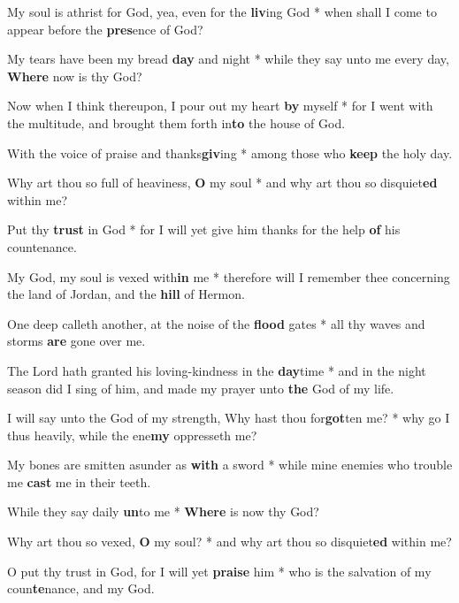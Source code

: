\begin{multicols}{2}
	My soul is athrist for God, yea, even for the \textbf{liv}ing God * when shall I come to appear before the \textbf{pres}ence of God?
	
	My tears have been my bread \textbf{day} and night * while they say unto me every day, \textbf{Where} now is thy God?
	
	Now when I think thereupon, I pour out my heart \textbf{by} myself * for I went with the multitude, and brought them forth in\textbf{to} the house of God.
	
	With the voice of praise and thanks\textbf{giv}ing * among those who \textbf{keep} the holy day.
	
	Why art thou so full of heaviness, \textbf{O} my soul * and why art thou so disquiet\textbf{ed} within me?
	
	Put thy \textbf{trust} in God * for I will yet give him thanks for the help \textbf{of} his countenance.
	
	My God, my soul is vexed with\textbf{in} me * therefore will I remember thee concerning the land of Jordan, and the \textbf{hill} of Hermon.
	
	One deep calleth another, at the noise of the \textbf{flood} gates * all thy waves and storms \textbf{are} gone over me.
	
	The Lord hath granted his loving-kindness in the \textbf{day}time * and in the night season did I sing of him, and made my prayer unto \textbf{the} God of my life.
	
	I will say unto the God of my strength, Why hast thou for\textbf{got}ten me? * why go I thus heavily, while the ene\textbf{my} oppresseth me?
	
	My bones are smitten asunder as \textbf{with} a sword * while mine enemies who trouble me \textbf{cast} me in their teeth.
	
	While they say daily \textbf{un}to me * \textbf{Where} is now thy God?
	
	Why art thou so vexed, \textbf{O} my soul? * and why art thou so disquiet\textbf{ed} within me?
	
	O put thy trust in God, for I will yet \textbf{praise} him * who is the salvation of my coun\textbf{te}nance, and my God.
\end{multicols}